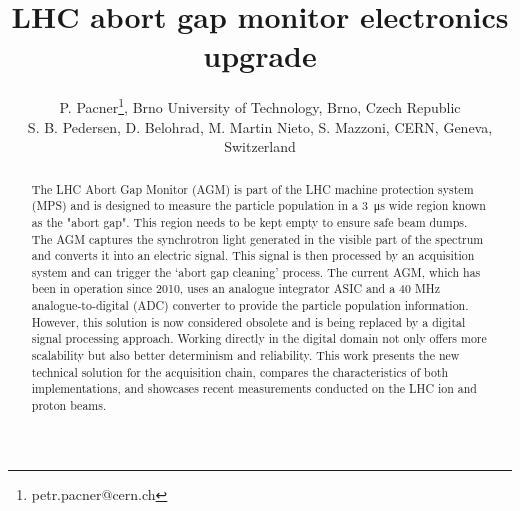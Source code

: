 



\title{LHC abort gap monitor electronics upgrade}

\author{P. Pacner\thanks{petr.pacner@cern.ch}, Brno University of Technology, Brno, Czech Republic \\
		S. B. Pedersen, D. Belohrad, M. Martin Nieto, S. Mazzoni, CERN, Geneva, Switzerland}
	
\maketitle

\begin{abstract}
    The LHC Abort Gap Monitor (AGM) is part of the LHC machine protection
    system (MPS) and is designed to measure the particle population in a \SI{3}{\micro\second}
    wide region known as the "abort gap". This region needs to be kept empty to
    ensure safe beam dumps. The AGM captures the synchrotron light generated in
    the visible part of the spectrum and converts it into an electric signal.
    This signal is then processed by an acquisition system and can trigger the
    ‘abort gap cleaning’ process. The current AGM, which has been in operation
    since 2010, uses an analogue integrator ASIC and a 40 MHz
    analogue-to-digital (ADC) converter to provide the particle population
    information. However, this solution is now considered obsolete and is being
    replaced by a digital signal processing approach. Working directly in the
    digital domain not only offers more scalability but also better determinism
    and reliability. This work presents the new technical solution for the
    acquisition chain, compares the characteristics of both implementations,
    and showcases recent measurements conducted on the LHC ion and proton
    beams.
\end{abstract}

